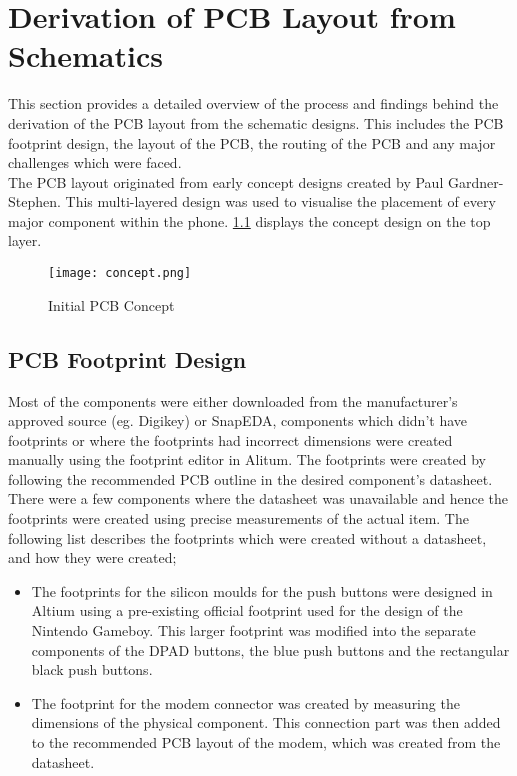 
\chapter{Derivation of PCB Layout from Schematics} %

\label{Chapter6} %

	This section provides a detailed overview of the process and findings behind the derivation of the PCB layout from the schematic designs. This includes the PCB footprint design, the layout of the PCB, the routing of the PCB and any major challenges which were faced.\\
The PCB layout originated from early concept designs created by Paul Gardner-Stephen. This multi-layered design was used to visualise the placement of every major component within the phone. \ref{fig:Concept} displays the concept design on the top layer. 

\begin{figure}
	\texttt{[image: concept.png]}
	\caption{Initial PCB Concept}
	\label{fig:Concept}
\end{figure}

\section{PCB Footprint Design}

	Most of the components were either downloaded from the manufacturer's approved source (eg. Digikey) or SnapEDA, components which didn't have footprints or where the footprints had incorrect dimensions were created manually using the footprint editor in Alitum. The footprints were created by following the recommended PCB outline in the desired component's datasheet. There were a few components where the datasheet was unavailable and hence the footprints were created using precise measurements of the actual item. The following list describes the footprints which were created without a datasheet, and how they were created;

\begin{itemize}
\item The footprints for the silicon moulds for the push buttons were designed in Altium using a pre-existing official footprint used for the design of the Nintendo Gameboy. This larger footprint was modified into the separate components of the DPAD buttons, the blue push buttons and the rectangular black push buttons.
\item The footprint for the modem connector was created by measuring the dimensions of the physical component. This connection part was then added to the recommended PCB layout of the modem, which was created from the datasheet. 
\end{itemize}

